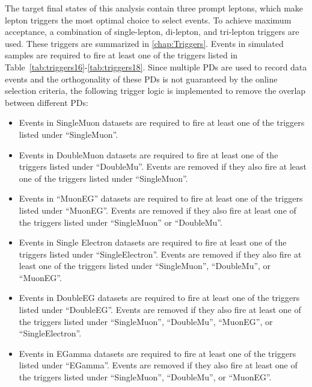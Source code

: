 The target final states of this analysis contain three prompt leptons, which make lepton triggers the most optimal choice to select events. To achieve maximum acceptance, a combination of single-lepton, di-lepton, and tri-lepton triggers are used. These triggers are summarized in \autoref{chap:Triggers}. Events in simulated samples are required to fire at least one of the triggers listed in Table~\ref{tab:triggers16}-\ref{tab:triggers18}. Since multiple \acp{PD} are used to record data events and the orthogonality of these \acp{PD} is not guaranteed by the online selection criteria, the following trigger logic is implemented to remove the overlap between different \acp{PD}:

\begin{itemize}
\item Events in SingleMuon datasets are required to fire at least one of the triggers listed under ``SingleMuon''. 
\item Events in DoubleMuon datasets are required to fire at least one of the triggers listed under ``DoubleMu''. Events are removed if they also fire at least one of the triggers listed under ``SingleMuon''.
\item Events in ``MuonEG'' datasets are required to fire at least one of the triggers listed under ``MuonEG''. Events are removed if they also fire at least one of the triggers listed under ``SingleMuon'' or ``DoubleMu''.
\item Events in Single Electron datasets are required to fire at least one of the triggers listed under ``SingleElectron''. Events are removed if they also fire at least one of the triggers listed under ``SingleMuon'', ``DoubleMu'', or ``MuonEG''.
\item Events in DoubleEG datasets are required to fire at least one of the triggers listed under ``DoubleEG''. Events are removed if they also fire at least one of the triggers listed under ``SingleMuon'', ``DoubleMu'', ``MuonEG'', or ``SingleElectron''.
\item Events in EGamma datasets are required to fire at least one of the triggers listed under ``EGamma''. Events are removed if they also fire at least one of the triggers listed under ``SingleMuon'', ``DoubleMu'', or ``MuonEG''.
\end{itemize}